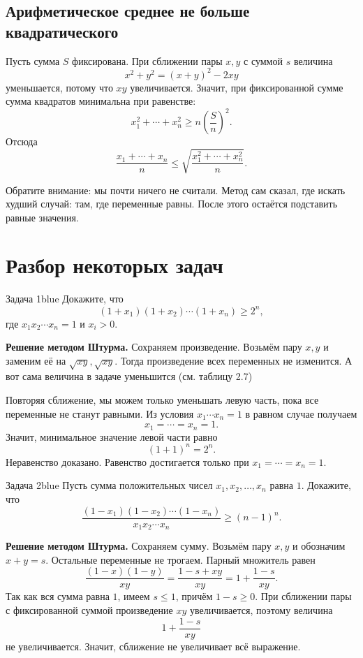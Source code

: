 \section{Арифметическое среднее не больше квадратического}

Пусть сумма $S$ фиксирована. При сближении пары $x,y$ с суммой $s$ величина
\[
    x^2+y^2=(x+y)^2-2xy
\]
уменьшается, потому что $xy$ увеличивается. Значит, при фиксированной сумме сумма квадратов минимальна при равенстве:
\[
    x_1^2+\cdots+x_n^2\ge n\left(\frac{S}{n}\right)^2.
\]
Отсюда
\[
    \frac{x_1+\cdots+x_n}{n}\le
    \sqrt{\frac{x_1^2+\cdots+x_n^2}{n}}.
\]

\begin{remarkbox}
Обратите внимание: мы почти ничего не считали. Метод сам сказал, где искать худший случай: там, где переменные равны. После этого остаётся подставить равные значения.
\end{remarkbox}

\chapter{Разбор некоторых задач}

{}
\begin{taskbox}{Задача 1}{blue}{}
Докажите, что
\[
    (1+x_1)(1+x_2)\cdots(1+x_n)\ge 2^n,
\]
где $x_1x_2\cdots x_n=1$ и $x_i>0$.
\end{taskbox}

\textbf{Решение методом Штурма.}
Сохраняем произведение. Возьмём пару $x,y$ и заменим её на $\sqrt{xy},\sqrt{xy}$. Тогда произведение всех переменных не изменится. А вот сама величина в задаче уменьшится (см. таблицу 2.7)

Повторяя сближение, мы можем только уменьшать левую часть, пока все переменные не станут равными. Из условия $x_1\cdots x_n=1$ в равном случае получаем
\[
    x_1=\cdots=x_n=1.
\]
Значит, минимальное значение левой части равно
\[
    (1+1)^n=2^n.
\]
Неравенство доказано. Равенство достигается только при $x_1=\cdots=x_n=1$.

{}
\begin{taskbox}{Задача 2}{blue}{}
Пусть сумма положительных чисел $x_1,x_2,\ldots,x_n$ равна $1$. Докажите, что
\[
    \frac{(1-x_1)(1-x_2)\cdots(1-x_n)}{x_1x_2\cdots x_n}
    \ge (n-1)^n.
\]
\end{taskbox}

\textbf{Решение методом Штурма.}
Сохраняем сумму. Возьмём пару $x,y$ и обозначим $x+y=s$. Остальные переменные не трогаем. Парный множитель равен
\[
    \frac{(1-x)(1-y)}{xy}
    =\frac{1-s+xy}{xy}
    =1+\frac{1-s}{xy}.
\]
Так как вся сумма равна $1$, имеем $s\le1$, причём $1-s\ge0$. При сближении пары с фиксированной суммой произведение $xy$ увеличивается, поэтому величина
\[
    1+\frac{1-s}{xy}
\]
не увеличивается. Значит, сближение не увеличивает всё выражение.

